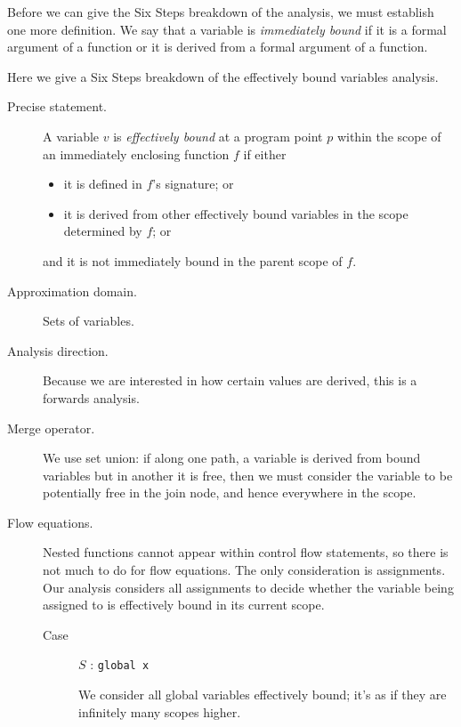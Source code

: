 \documentclass[letterpaper,11pt]{article}
\begin{document}
Before we can give the Six Steps breakdown of the analysis, we must establish
one more definition. We say that a variable is \emph{immediately bound} if it
is a formal argument of a function or it is derived from a formal argument of a
function.

Here we give a Six Steps breakdown of the effectively bound variables analysis.

\begin{description}
    \item[Precise statement.]
        A variable $v$ is \emph{effectively bound} at a program point $p$
        within the scope of an immediately enclosing function $f$ if either
        \begin{itemize}
            \item
                it is defined in $f$'s signature; or
            \item
                it is derived from other effectively bound variables in the
                scope determined by $f$; or
        \end{itemize}
        and it is not immediately bound in the parent scope of $f$.

    \item[Approximation domain.]
        Sets of variables.

    \item[Analysis direction.]
        Because we are interested in how certain values are derived, this is a
        forwards analysis.

    \item[Merge operator.]
        We use set union: if along one path, a variable is derived from bound
        variables but in another it is free, then we must consider the variable
        to be potentially free in the join node, and hence everywhere in the
        scope.

    \item[Flow equations.]
        Nested functions cannot appear within control flow statements, so there
        is not much to do for flow equations. The only consideration is
        assignments. Our analysis considers all assignments to decide whether
        the variable being assigned to is effectively bound in its current
        scope.

        \begin{description}
            \item[Case] $S$ : \texttt{global x}

                We consider all global variables effectively bound; it's as if
                they are infinitely many scopes higher.


\end{description}
\end{description}
\end{document}
